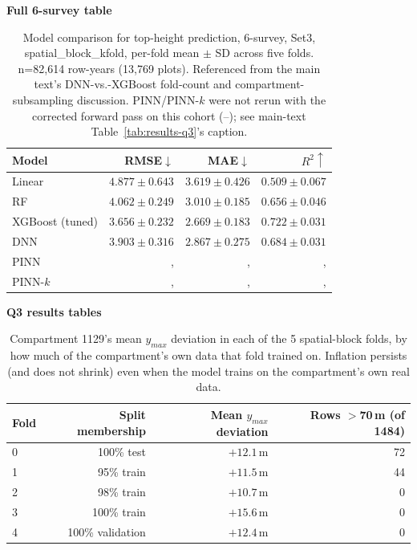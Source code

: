 \documentclass[logo,msc,ai]{infthesis}           %
\begin{document}
\begin{table}[H]
\centering
\textbf{Full 6-survey table}\label{app:results-q3-6survey}\\[4pt]
\scriptsize
\setlength{\tabcolsep}{4pt}
\renewcommand{\arraystretch}{1.2}
\begin{tabular}{lrrr}
\toprule
Model & RMSE${\downarrow}$ & MAE${\downarrow}$ & $R^2{\uparrow}$ \\
\midrule
Linear & $4.877{\pm}0.643$ & $3.619{\pm}0.426$ & $0.509{\pm}0.067$ \\
RF & $4.062{\pm}0.249$ & $3.010{\pm}0.185$ & $0.656{\pm}0.046$ \\
XGBoost (tuned) & $\mathbf{3.656{\pm}0.232}$ & $\mathbf{2.669{\pm}0.183}$ & $\mathbf{0.722{\pm}0.031}$ \\
DNN & $3.903{\pm}0.316$ & $2.867{\pm}0.275$ & $0.684{\pm}0.031$ \\
PINN &, &, &, \\
PINN-$k$ &, &, &, \\
\bottomrule
\end{tabular}
\caption{\small{Model comparison for top-height prediction, 6-survey, Set3,
spatial\_block\_kfold, per-fold mean $\pm$ SD across five folds. n=82{,}614 row-years
(13{,}769 plots). Referenced from the main text's DNN-vs.-XGBoost fold-count and
compartment-subsampling discussion. PINN/PINN-$k$ were not rerun with the corrected
forward pass on this cohort (--); see main-text Table~\ref{tab:results-q3}'s caption.}}
\label{tab:results-q3-6survey}
\end{table}

\label{app:results-q3-tables}

\begin{table}[H]
\centering
\textbf{Q3 results tables}\\[4pt]
\scriptsize
\begin{tabular}{lrrr}
\toprule
Fold & Split membership & Mean $y_{max}$ deviation & Rows $>$70\,m (of 1484) \\
\midrule
0 & 100\% test & $+12.1$\,m & 72 \\
1 & 95\% train & $+11.5$\,m & 44 \\
2 & 98\% train & $+10.7$\,m & 0 \\
3 & 100\% train & $+15.6$\,m & 0 \\
4 & 100\% validation & $+12.4$\,m & 0 \\
\bottomrule
\end{tabular}
\caption{\small{Compartment 1129's mean $y_{max}$ deviation in each of the 5 spatial-block
folds, by how much of the compartment's own data that fold trained on. Inflation persists (and
does not shrink) even when the model trains on the compartment's own real data.}}
\label{tab:compartment1129-crossfold}
\end{table}
\end{document}
